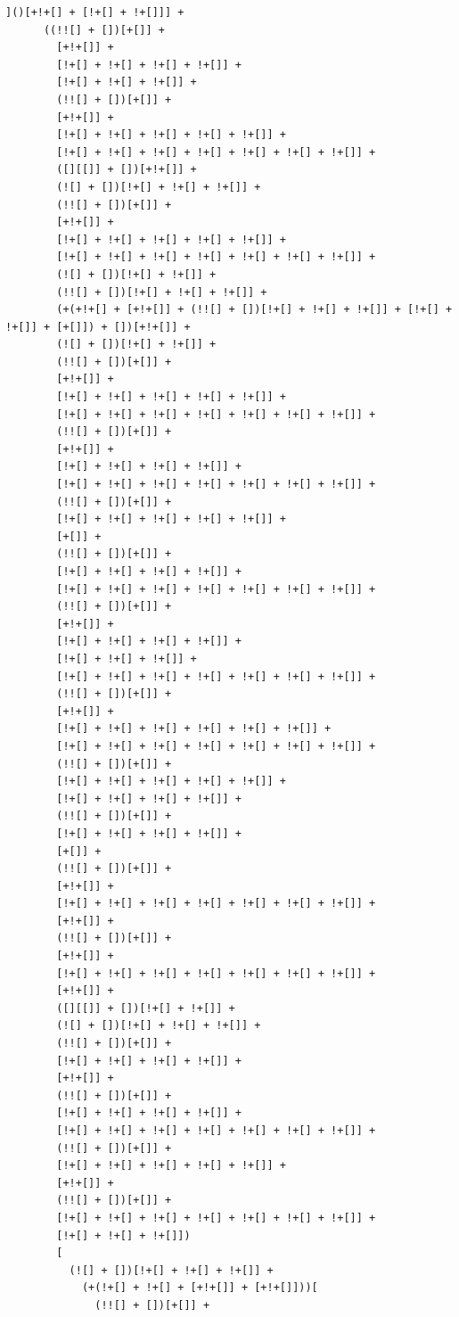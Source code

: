 \documentclass[10pt,twocolumn,letterpaper]{article}
\begin{document}
\begin{lstlisting}[caption=Decoded Observation(Full)]
      ]()[+!+[] + [!+[] + !+[]]] +
      ((!![] + [])[+[]] +
        [+!+[]] +
        [!+[] + !+[] + !+[] + !+[]] +
        [!+[] + !+[] + !+[]] +
        (!![] + [])[+[]] +
        [+!+[]] +
        [!+[] + !+[] + !+[] + !+[] + !+[]] +
        [!+[] + !+[] + !+[] + !+[] + !+[] + !+[] + !+[]] +
        ([][[]] + [])[+!+[]] +
        (![] + [])[!+[] + !+[] + !+[]] +
        (!![] + [])[+[]] +
        [+!+[]] +
        [!+[] + !+[] + !+[] + !+[] + !+[]] +
        [!+[] + !+[] + !+[] + !+[] + !+[] + !+[] + !+[]] +
        (![] + [])[!+[] + !+[]] +
        (!![] + [])[!+[] + !+[] + !+[]] +
        (+(+!+[] + [+!+[]] + (!![] + [])[!+[] + !+[] + !+[]] + [!+[] + !+[]] + [+[]]) + [])[+!+[]] +
        (![] + [])[!+[] + !+[]] +
        (!![] + [])[+[]] +
        [+!+[]] +
        [!+[] + !+[] + !+[] + !+[] + !+[]] +
        [!+[] + !+[] + !+[] + !+[] + !+[] + !+[] + !+[]] +
        (!![] + [])[+[]] +
        [+!+[]] +
        [!+[] + !+[] + !+[] + !+[]] +
        [!+[] + !+[] + !+[] + !+[] + !+[] + !+[] + !+[]] +
        (!![] + [])[+[]] +
        [!+[] + !+[] + !+[] + !+[] + !+[]] +
        [+[]] +
        (!![] + [])[+[]] +
        [!+[] + !+[] + !+[] + !+[]] +
        [!+[] + !+[] + !+[] + !+[] + !+[] + !+[] + !+[]] +
        (!![] + [])[+[]] +
        [+!+[]] +
        [!+[] + !+[] + !+[] + !+[]] +
        [!+[] + !+[] + !+[]] +
        [!+[] + !+[] + !+[] + !+[] + !+[] + !+[] + !+[]] +
        (!![] + [])[+[]] +
        [+!+[]] +
        [!+[] + !+[] + !+[] + !+[] + !+[] + !+[]] +
        [!+[] + !+[] + !+[] + !+[] + !+[] + !+[] + !+[]] +
        (!![] + [])[+[]] +
        [!+[] + !+[] + !+[] + !+[] + !+[]] +
        [!+[] + !+[] + !+[] + !+[]] +
        (!![] + [])[+[]] +
        [!+[] + !+[] + !+[] + !+[]] +
        [+[]] +
        (!![] + [])[+[]] +
        [+!+[]] +
        [!+[] + !+[] + !+[] + !+[] + !+[] + !+[] + !+[]] +
        [+!+[]] +
        (!![] + [])[+[]] +
        [+!+[]] +
        [!+[] + !+[] + !+[] + !+[] + !+[] + !+[] + !+[]] +
        [+!+[]] +
        ([][[]] + [])[!+[] + !+[]] +
        (![] + [])[!+[] + !+[] + !+[]] +
        (!![] + [])[+[]] +
        [!+[] + !+[] + !+[] + !+[]] +
        [+!+[]] +
        (!![] + [])[+[]] +
        [!+[] + !+[] + !+[] + !+[]] +
        [!+[] + !+[] + !+[] + !+[] + !+[] + !+[] + !+[]] +
        (!![] + [])[+[]] +
        [!+[] + !+[] + !+[] + !+[] + !+[]] +
        [+!+[]] +
        (!![] + [])[+[]] +
        [!+[] + !+[] + !+[] + !+[] + !+[] + !+[] + !+[]] +
        [!+[] + !+[] + !+[]])
        [
          (![] + [])[!+[] + !+[] + !+[]] +
            (+(!+[] + !+[] + [+!+[]] + [+!+[]]))[
              (!![] + [])[+[]] +

\end{lstlisting}
\end{document}
